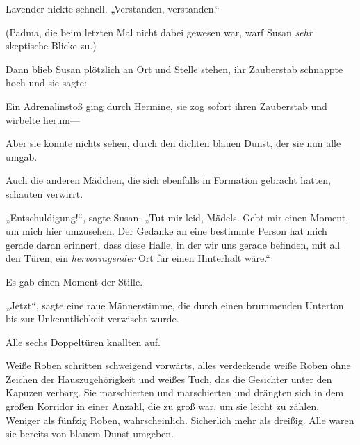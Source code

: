 Lavender nickte schnell.
„Verstanden, verstanden.“

(Padma, die beim letzten Mal nicht dabei gewesen war, warf Susan \emph{sehr} skeptische Blicke zu.)

Dann blieb Susan plötzlich an Ort und Stelle stehen, ihr Zauberstab schnappte hoch und sie sagte: 

Ein Adrenalinstoß ging durch Hermine, sie zog sofort ihren Zauberstab und wirbelte herum—

Aber sie konnte nichts sehen, durch den dichten blauen Dunst, der sie nun alle umgab.

Auch die anderen Mädchen, die sich ebenfalls in Formation gebracht hatten, schauten verwirrt.

„Entschuldigung!“, sagte Susan.
„Tut mir leid, Mädels. Gebt mir einen Moment, um mich hier umzusehen. Der Gedanke an eine bestimmte Person hat mich gerade daran erinnert, dass diese Halle, in der wir uns gerade befinden, mit all den Türen, ein \emph{hervorragender} Ort für einen Hinterhalt wäre.“

Es gab einen Moment der Stille.

„Jetzt“, sagte eine raue Männerstimme, die durch einen brummenden Unterton bis zur Unkenntlichkeit verwischt wurde.

Alle sechs Doppeltüren knallten auf.

Weiße Roben schritten schweigend vorwärts, alles verdeckende weiße Roben ohne Zeichen der Hauszugehörigkeit und weißes Tuch, das die Gesichter unter den Kapuzen verbarg. Sie marschierten und marschierten und drängten sich in dem großen Korridor in einer Anzahl, die zu groß war, um sie leicht zu zählen. Weniger als fünfzig Roben, wahrscheinlich. Sicherlich mehr als dreißig. Alle waren sie bereits von blauem Dunst umgeben.

